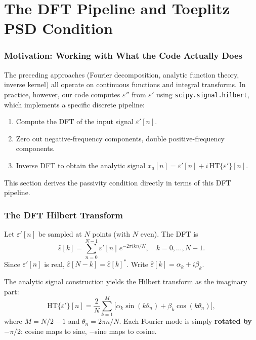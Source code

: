 \documentclass[11pt]{article}
\newcommand{\eps}{\varepsilon}
\begin{document}
\part{The DFT Pipeline and Toeplitz PSD Condition}

\section{Motivation: Working with What the Code Actually Does}

The preceding approaches (Fourier decomposition, analytic function theory, inverse kernel) all operate on continuous functions and integral transforms.  In practice, however, our code computes $\eps''$ from $\eps'$ using \texttt{scipy.signal.hilbert}, which implements a specific discrete pipeline:
\begin{enumerate}
\item Compute the DFT of the input signal $\eps'[n]$.
\item Zero out negative-frequency components, double positive-frequency components.
\item Inverse DFT to obtain the analytic signal $x_a[n] = \eps'[n] + i\,\mathrm{HT}\{\eps'\}[n]$.
\end{enumerate}
This section derives the passivity condition directly in terms of this DFT pipeline.

\section{The DFT Hilbert Transform}

Let $\eps'[n]$ be sampled at $N$ points (with $N$ even).  The DFT is
\begin{equation}
\hat\eps[k] = \sum_{n=0}^{N-1} \eps'[n]\, e^{-2\pi i kn/N}, \quad k = 0, \ldots, N-1.
\end{equation}
Since $\eps'[n]$ is real, $\hat\eps[N-k] = \hat\eps[k]^*$.  Write $\hat\eps[k] = \alpha_k + i\beta_k$.

The analytic signal construction yields the Hilbert transform as the imaginary part:
\begin{equation}\label{eq:dft-ht}
\mathrm{HT}\{\eps'\}[n] = \frac{2}{N}\sum_{k=1}^{M}\bigl[\alpha_k \sin(k\theta_n) + \beta_k\cos(k\theta_n)\bigr],
\end{equation}
where $M = N/2 - 1$ and $\theta_n = 2\pi n/N$.  Each Fourier mode is simply \textbf{rotated by $-\pi/2$}: cosine maps to sine, $-$sine maps to cosine.
\end{document}
